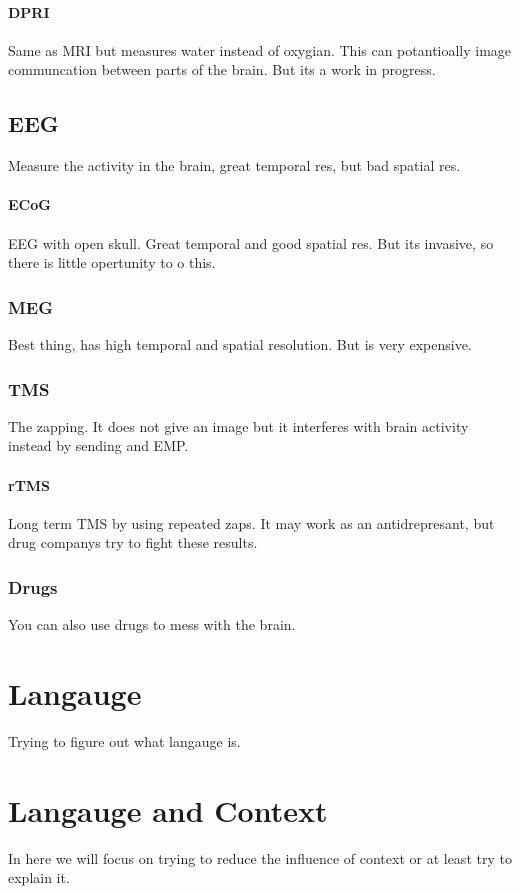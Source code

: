 \documentclass{article}
\begin{document}
\paragraph{DPRI}
Same as MRI but measures water instead of oxygian.
This can potantioally image communcation between parts
of the brain. But its a work in progress.

\subsection{EEG}
Measure the activity in the brain, great temporal res,
but bad spatial res.

\paragraph{ECoG}
EEG with open skull. Great temporal and good spatial res.
But its invasive, so there is little opertunity to o this.

\subsubsection{MEG}
Best thing, has high temporal and spatial resolution.
But is very expensive.

\subsubsection{TMS}
The zapping. It does not give an image but it interferes
with brain activity instead by sending and EMP.

\paragraph{rTMS} Long term TMS by using repeated zaps.
It may work as an antidrepresant, but drug companys try to fight these 
results.

\subsubsection{Drugs}

You can also use drugs to mess with the brain.

\section{Langauge}
Trying to figure out what langauge is.

\section{Langauge and Context}
In here we will focus on trying to reduce the influence of context or
at least try to explain it.
\end{document}
